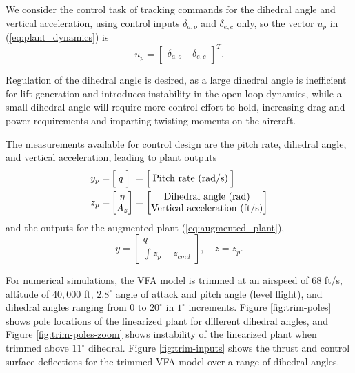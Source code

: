 \documentclass[english]{ifacconf}
\begin{document}
We consider the control task of tracking commands for the dihedral angle and vertical acceleration, using control inputs $\delta_{a,o}$ and $\delta_{e,c}$ only, so the vector $u_p$ in (\ref{eq:plant_dynamics}) is
\begin{equation}
	u_p = \begin{bmatrix}
\delta_{a,o} & \; \delta_{e,c}
\end{bmatrix}^T.
\end{equation}

Regulation of the dihedral angle is desired, as a large dihedral angle is inefficient for lift generation and introduces instability in the open-loop dynamics, while a small dihedral angle will require more control effort to hold, increasing drag and power requirements and imparting twisting moments on the aircraft. 

The measurements available for control design are the pitch rate, dihedral angle, and vertical acceleration, leading to plant outputs
\begin{equation}
\begin{aligned}
y_p =& \, \Big[\; q \; \Big] \;= \Big[\: \text{Pitch rate (rad/s)} \:\Big] \\
z_p =& \begin{bmatrix}
\eta \\
A_z
\end{bmatrix} =\begin{bmatrix}
	$Dihedral angle (rad)$\\
	$Vertical acceleration (ft/s)$
\end{bmatrix}		
\end{aligned}
\end{equation}
and the outputs for the augmented plant (\ref{eq:augmented_plant}),
\begin{equation}
y = \begin{bmatrix}
	q \\ \int{z_p - z_{cmd}}
\end{bmatrix}, \quad z = z_p.
\end{equation}

For numerical simulations, the VFA model is trimmed at an airspeed of $68$ ft/s, altitude of $40,000$ ft, $2.8^\circ$ angle of attack and pitch angle (level flight), and dihedral angles ranging from $0$ to $20^\circ$ in $1^\circ$ increments. Figure \ref{fig:trim-poles} shows pole locations of the linearized plant for different dihedral angles, and Figure \ref{fig:trim-poles-zoom} shows instability of the linearized plant when trimmed above $11^\circ$ dihedral. Figure \ref{fig:trim-inputs} shows the thrust and control surface deflections for the trimmed VFA model over a range of dihedral angles.
\end{document}
